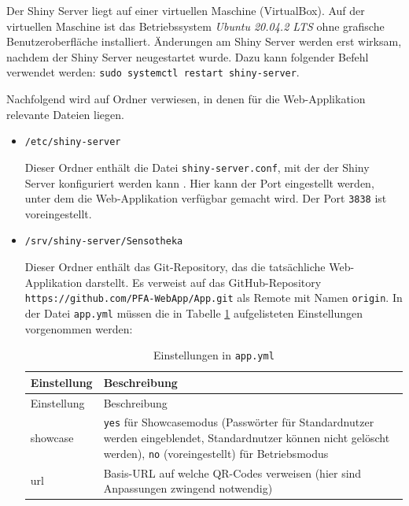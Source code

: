 \documentclass[
]{article}
\begin{document}
Der Shiny Server liegt auf einer virtuellen Maschine (VirtualBox). Auf der virtuellen Maschine ist das Betriebssystem \emph{Ubuntu 20.04.2 LTS} ohne grafische Benutzeroberfläche installiert. Änderungen am Shiny Server werden erst wirksam, nachdem der Shiny Server neugestartet wurde. Dazu kann folgender Befehl verwendet werden: \texttt{sudo\ systemctl\ restart\ shiny-server}.

Nachfolgend wird auf Ordner verwiesen, in denen für die Web-Applikation relevante Dateien liegen.

\begin{itemize}
\item
  \texttt{/etc/shiny-server}

  Dieser Ordner enthält die Datei \texttt{shiny-server.conf}, mit der der Shiny Server konfiguriert werden kann \autocite{shiny-server}. Hier kann der Port eingestellt werden, unter dem die Web-Applikation verfügbar gemacht wird. Der Port \texttt{3838} ist voreingestellt.
\end{itemize}

\begin{itemize}
\item
  \texttt{/srv/shiny-server/Sensotheka}

  Dieser Ordner enthält das Git-Repository, das die tatsächliche Web-Applikation darstellt. Es verweist auf das GitHub-Repository \texttt{https://github.com/PFA-WebApp/App.git} als Remote mit Namen \texttt{origin}. In der Datei \texttt{app.yml} müssen die in Tabelle \ref{tab:app-yml} aufgelisteten Einstellungen vorgenommen werden:

  \begin{longtable}[]{@{}
    >{\raggedright\arraybackslash}p{}
    >{\raggedright\arraybackslash}p{}@{}}
  \caption{\label{tab:app-yml} Einstellungen in \texttt{app.yml}}\tabularnewline
  \toprule
  Einstellung & Beschreibung \\
  \midrule
  \endfirsthead
  \toprule
  Einstellung & Beschreibung \\
  \midrule
  \endhead
  showcase & \texttt{yes} für Showcasemodus (Passwörter für Standardnutzer werden eingeblendet, Standardnutzer können nicht gelöscht werden), \texttt{no} (voreingestellt) für Betriebsmodus \\
  url & Basis-URL auf welche QR-Codes verweisen (hier sind Anpassungen zwingend notwendig) \\
  \bottomrule
  \end{longtable}
\end{itemize}
\end{document}
